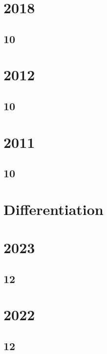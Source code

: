 \section{2018}
\subsection{10}

\section{2012}
\subsection{10}

\section{2011}
\subsection{10}

%


\section{Differentiation}
\section{2023}
\subsection{12}


\section{2022}
\subsection{12}

